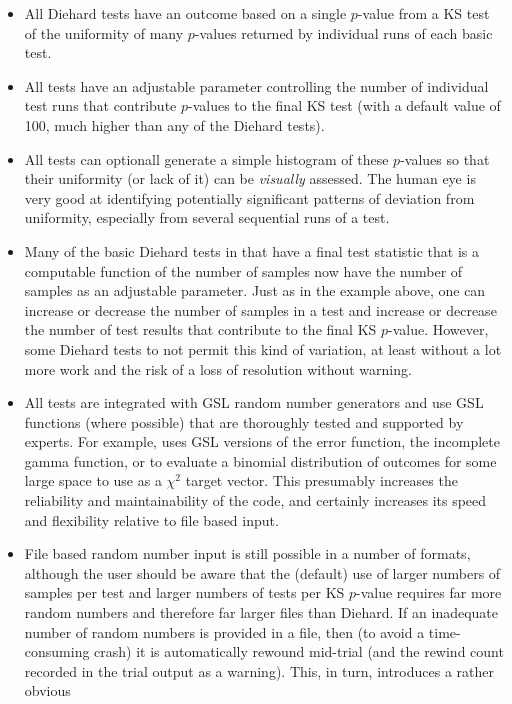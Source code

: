 \documentclass{book}
\begin{document}
\begin{itemize}

 \item All \die Diehard tests have an outcome based on a single
$p$-value from a KS test of the uniformity of many $p$-values returned
by individual runs of each basic test.
 \item All \die tests have an adjustable parameter controlling the
number of individual test runs that contribute $p$-values to the final
KS test (with a default value of 100, much higher than any of the
Diehard tests).
 \item All \die tests can optionall generate a simple histogram of these
$p$-values so that their uniformity (or lack of it) can be {\em
visually} assessed.  The human eye is very good at identifying
potentially significant patterns of deviation from uniformity,
especially from several sequential runs of a test.
 \item Many of the basic Diehard tests in \die that have a final test
statistic that is a computable function of the number of samples now
have the number of samples as an adjustable parameter.  Just as in the
example above, one can increase or decrease the number of samples in a
test and increase or decrease the number of test results that contribute
to the final KS $p$-value.  However, some Diehard tests to not permit
this kind of variation, at least without a lot more work and the risk of
a loss of resolution without warning.
 \item All tests are integrated with GSL random number generators and
use GSL functions (where possible) that are thoroughly tested and
supported by experts. For example, \die uses GSL versions of the error
function, the incomplete gamma function, or to evaluate a binomial
distribution of outcomes for some large space to use as a $\chi^2$
target vector.  This presumably increases the reliability and
maintainability of the code, and certainly increases its speed and
flexibility relative to file based input.
 \item File based random number input is still possible in a number of
formats, although the user should be aware that the (default) use of
larger numbers of samples per test and larger numbers of tests per KS
$p$-value requires far more random numbers and therefore far larger
files than Diehard.  If an inadequate number of random numbers is
provided in a file, then (to avoid a time-consuming crash) it is
automatically rewound mid-trial (and the rewind count recorded in the
trial output as a warning).  This, in turn, introduces a rather obvious

\end{itemize}
\end{document}
